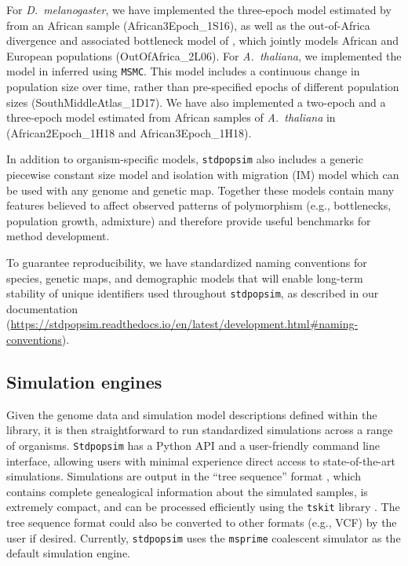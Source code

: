 \documentclass[12pt,halfline,a4paper]{ouparticle}
\newcommand{\Stdpopsim}{\texttt{Stdpopsim}\xspace}
\newcommand{\stdpopsim}{\texttt{stdpopsim}\xspace}
\newcommand{\MSMC}{\texttt{MSMC}\xspace}
\newcommand{\tskit}{\texttt{tskit}\xspace}
\begin{document}
For \textit{D.~melanogaster}, we have implemented the three-epoch model estimated by \cite{sheehan2016deep} from
an African sample (African3Epoch\_1S16), as well as the out-of-Africa divergence
and associated bottleneck model of \cite{li2006inferring}, which jointly models African
and European populations (OutOfAfrica\_2L06). For \textit{A.~thaliana}, we implemented the
model in \cite{durvasula2017african} inferred using \MSMC. This model includes
a continuous change in population size over time, rather than pre-specified epochs of different
population sizes (SouthMiddleAtlas\_1D17). We have also implemented a two-epoch and a three-epoch model estimated from African
samples of \textit{A.~thaliana} in \cite{huber2018gene} (African2Epoch\_1H18 and African3Epoch\_1H18).

In addition to organism-specific models, \stdpopsim also includes a generic piecewise constant size model and
isolation with migration (IM) model which can be used with any genome and genetic map. 
Together these models
contain many features believed to affect observed patterns of polymorphism (e.g., bottlenecks, population growth,
admixture) and therefore provide useful benchmarks for method development.



To guarantee reproducibility,
we have standardized naming
conventions for species, genetic maps, and demographic models that will enable long-term stability
of unique identifiers used throughout \stdpopsim,
as described in our documentation
(\url{https://stdpopsim.readthedocs.io/en/latest/development.html#naming-conventions}).

 \subsection*{Simulation engines}

Given the genome data and simulation model descriptions defined within the
library, it is then straightforward to run standardized simulations
across a range of organisms. \Stdpopsim has a Python API and a user-friendly
command line interface, allowing users with minimal experience direct access to
state-of-the-art simulations. Simulations are output in the ``tree sequence''
format \citep{kelleher2016efficient,kelleher2018efficient,kelleher2019inferring}, which
contains complete genealogical information about the simulated samples, is
extremely compact, and can be processed efficiently using the \tskit library
\citep{kelleher2016efficient,kelleher2018efficient}.
The tree sequence format could also be converted
to other formats (e.g., VCF) by the user if desired.
Currently, \stdpopsim uses the  \texttt{msprime} coalescent simulator \citep{kelleher2016efficient}
as the default simulation engine.
\end{document}
